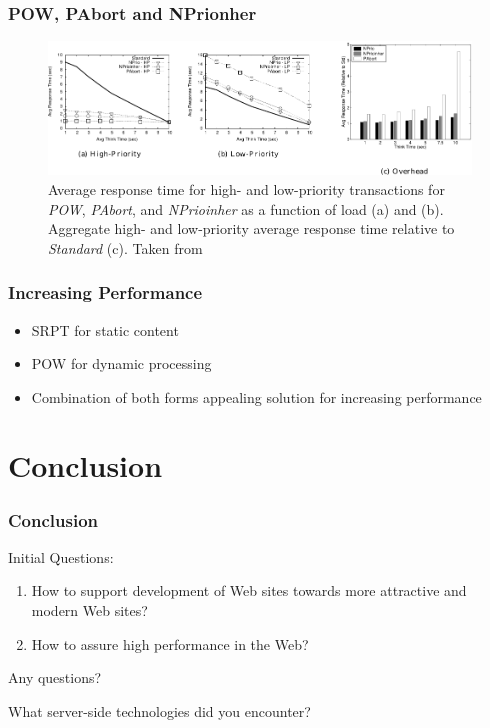 \documentclass[9pt]{beamer}
\begin{document}
\begin{frame}
\frametitle<presentation>{POW, PAbort and NPrionher}

  \begin{figure}[h]
    \centerline{\includegraphics[width=12cm]{pics/pow.pdf}}
    \caption{Average response time for high- and low-priority transactions for \textit{POW}, \textit{PAbort}, and \textit{NPrioinher} as a function of load (a) and (b). Aggregate high- and low-priority average response time
    relative to \textit{Standard} (c). Taken from \cite{McWherter}
    }
    \label{fig-pow}
  \end{figure}

\end{frame}

\begin{frame}
\frametitle<presentation>{Increasing Performance}
  \begin{itemize}
    \item SRPT for static content
    \item POW for dynamic processing
    \item Combination of both forms appealing solution for increasing performance
  \end{itemize}
\end{frame}

\section{Conclusion}
\begin{frame}
\frametitle<presentation>{Conclusion}
  Initial Questions:
  
  \begin{enumerate}
  \item How to support development of Web sites towards more attractive and modern Web sites?
  \item How to assure high performance in the Web?
  \end{enumerate}

\end{frame}

\begin{frame}
  \begin{center}
    \huge{Any questions?}
  \end{center}
\end{frame}

\begin{frame}
  \begin{center}
    \huge{What server-side technologies did you encounter?}
  \end{center}
\end{frame}


\end{document}
